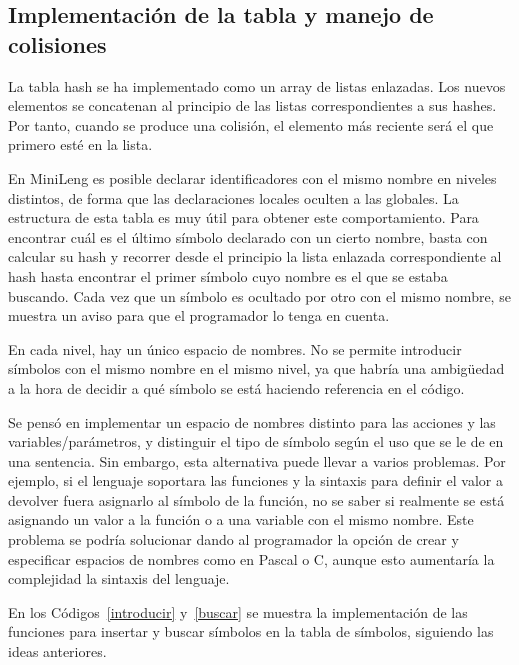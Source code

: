 \subsection{Implementación de la tabla y manejo de colisiones}
%
La tabla hash se ha implementado como un array de listas enlazadas. Los nuevos elementos se concatenan al principio de las listas correspondientes a sus hashes. Por tanto, cuando se produce una colisión, el elemento más reciente será el que primero esté en la lista.

En MiniLeng es posible declarar identificadores con el mismo nombre en niveles distintos, de forma que las declaraciones locales oculten a las globales. La estructura de esta tabla es muy útil para obtener este comportamiento. Para encontrar cuál es el último símbolo declarado con un cierto nombre, basta con calcular su hash y recorrer desde el principio la lista enlazada correspondiente al hash hasta encontrar el primer símbolo cuyo nombre es el que se estaba buscando. Cada vez que un símbolo es ocultado por otro con el mismo nombre, se muestra un aviso para que el programador lo tenga en cuenta.

En cada nivel, hay un único espacio de nombres. No se permite introducir símbolos con el mismo nombre en el mismo nivel, ya que habría una ambigüedad a la hora de decidir a qué símbolo se está haciendo referencia en el código.

Se pensó en implementar un espacio de nombres distinto para las acciones y las variables/parámetros, y distinguir el tipo de símbolo según el uso que se le de en una sentencia. Sin embargo, esta alternativa puede llevar a varios problemas. Por ejemplo, si el lenguaje soportara las funciones y la sintaxis para definir el valor a devolver fuera asignarlo al símbolo de la función, no se saber si realmente se está asignando un valor a la función o a una variable con el mismo nombre. Este problema se podría solucionar dando al programador la opción de crear y especificar espacios de nombres como en Pascal o C, aunque esto aumentaría la complejidad la sintaxis del lenguaje.

En los Códigos~\ref{introducir} y~\ref{buscar} se muestra la implementación de las funciones para insertar y buscar símbolos en la tabla de símbolos, siguiendo las ideas anteriores.

